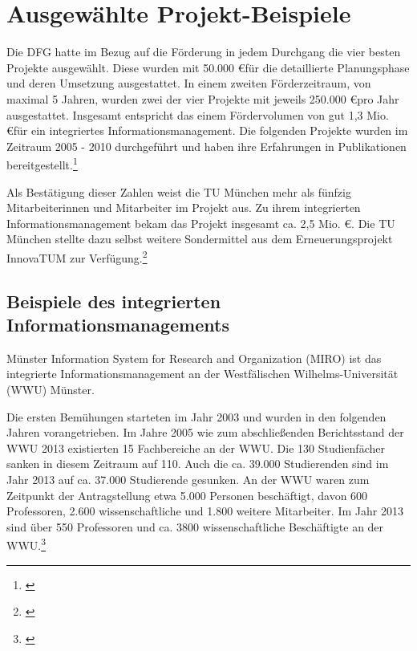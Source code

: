 \section{Ausgewählte Projekt-Beispiele}
\label{section_projekt_beispiele}
Die DFG hatte im Bezug auf die Förderung in jedem Durchgang die vier besten Projekte ausgewählt.
Diese wurden mit 50.000 \euro für die detaillierte Planungsphase und deren Umsetzung ausgestattet.
In einem zweiten Förderzeitraum, von maximal 5 Jahren, wurden zwei der vier Projekte mit jeweils 250.000 \euro pro Jahr ausgestattet.
Insgesamt entspricht das einem Fördervolumen von gut 1,3 Mio. \euro für ein integriertes Informationsmanagement.
Die folgenden Projekte wurden im Zeitraum 2005 - 2010 durchgeführt und haben ihre Erfahrungen in Publikationen bereitgestellt.\footnote{\cite{kerres_hochschulen_2005}}

Als Bestätigung dieser Zahlen weist die TU München mehr als fünfzig Mitarbeiterinnen und Mitarbeiter im Projekt aus. Zu ihrem integrierten Informationsmanagement bekam das Projekt insgesamt ca. 2,5 Mio. \euro. Die TU München stellte dazu selbst weitere Sondermittel aus dem Erneuerungsprojekt InnovaTUM zur Verfügung.\footnote{\cite{bode_informationsmanagement_2010}}

\subsection{Beispiele des integrierten Informationsmanagements}
Münster Information System for Research and Organization (MIRO) ist das integrierte Informationsmanagement an der Westfälischen Wilhelms-Universität  (WWU) Münster.

Die ersten Bemühungen starteten im Jahr 2003 und wurden in den folgenden Jahren vorangetrieben. Im Jahre 2005 wie zum abschließenden Berichtsstand der WWU 2013 existierten 15 Fachbereiche an der WWU. Die 130 Studienfächer sanken in diesem Zeitraum auf 110. Auch die ca. 39.000 Studierenden sind im Jahr 2013 auf ca. 37.000 Studierende gesunken. An der WWU waren zum Zeitpunkt der Antragstellung etwa 5.000 Personen beschäftigt, davon 600 Professoren, 2.600 wissenschaftliche und 1.800 weitere Mitarbeiter. Im Jahr 2013 sind über 550 Professoren und ca. 3800 wissenschaftliche Beschäftigte an der WWU.\footnote{\cite{vogl_bericht_2013}}


